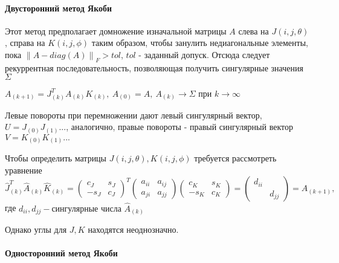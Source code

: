 \documentclass[12pt, a4paper]{report}
\theoremstyle{note}
\begin{document}
\paragraph{Двусторонний метод Якоби}
Этот метод предполагает домножение изначальной матрицы $A$ слева на $J(i,j,\theta)$, справа на $K(i,j,\phi)$ таким образом, чтобы занулить недиагональные элементы, пока $\left\| A - diag(A) \right\|_F > tol$, $tol$ - заданный допуск. 
Отсюда следует рекуррентная последовательность, позволяющая получить сингулярные значения $\Sigma$
\begin{center}
    $A_{(k+1)} = J^T_{(k)}A_{(k)}K_{(k)}, \ A_{(0)}= A, \ A_{(k)}\longrightarrow\Sigma \text{ при } k\to\infty$
\end{center}

Левые повороты при перемножении дают левый сингулярный вектор, $U=J_{(0)}J_{(1)}...$, аналогично, правые повороты - правый сингулярный вектор $V=K_{(0)}K_{(1)}...$

Чтобы определить матрицы $J(i,j,\theta), K(i,j,\phi)$ требуется рассмотреть уравнение
\begin{equation}
    \hat{J}_{(k)}^T\hat{A}_{(k)}\hat{K}_{(k)} = \begin{pmatrix}
        c_J&s_J\\
        -s_J&c_J
    \end{pmatrix}^T
    \begin{pmatrix}
        a_{ii}&a_{ij}\\
        a_{ji}&a_{jj}
    \end{pmatrix}
    \begin{pmatrix}
        c_K&s_K\\
        -s_K&c_K
    \end{pmatrix} = \begin{pmatrix}
        d_{ii} &\\
        &d_{jj}
    \end{pmatrix} = A_{(k+1)},
\end{equation}
где $d_{ii}, d_{jj} -\text{сингулярные числа } \hat{A}_{(k)}$

Однако углы для $J, K$ находятся неоднозначно.
\paragraph{Односторонний метод Якоби}
\end{document}
